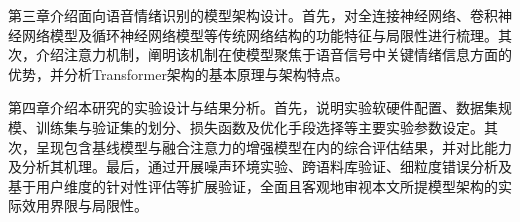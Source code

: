 第三章介绍面向语音情绪识别的模型架构设计。首先，对全连接神经网络、卷积神经网络模型及循环神经网络模型等传统网络结构的功能特征与局限性进行梳理。其次，介绍注意力机制，阐明该机制在使模型聚焦于语音信号中关键情绪信息方面的优势，并分析Transformer架构的基本原理与架构特点。

第四章介绍本研究的实验设计与结果分析。首先，说明实验软硬件配置、数据集规模、训练集与验证集的划分、损失函数及优化手段选择等主要实验参数设定。其次，呈现包含基线模型与融合注意力的增强模型在内的综合评估结果，并对比能力及分析其机理。最后，通过开展噪声环境实验、跨语料库验证、细粒度错误分析及基于用户维度的针对性评估等扩展验证，全面且客观地审视本文所提模型架构的实际效用界限与局限性。


